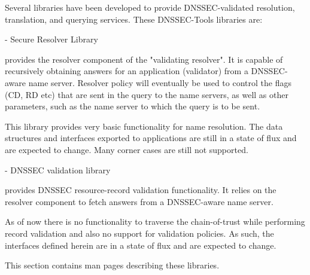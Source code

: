 
Several libraries have been developed to provide DNSSEC-validated resolution,
translation, and querying services.  These DNSSEC-Tools libraries are:

\begin{description}

\item{} - Secure Resolver Library

 provides the resolver component of the "validating resolver".
It is capable of recursively obtaining answers for an application (validator)
from a DNSSEC-aware name server.  Resolver policy will eventually be used to
control the flags (CD, RD etc) that are sent in the query to the name servers,
as well as other parameters, such as the name server to which the query is
to be sent.

This library provides very basic functionality for name resolution.  The data
structures and interfaces exported to applications are still in a state of
flux and are expected to change. Many corner cases are still not supported.

\item{} - DNSSEC validation library

 provides DNSSEC resource-record validation functionality.  It
relies on the resolver component to fetch answers from a DNSSEC-aware name
server.

As of now there is no functionality to traverse the chain-of-trust while
performing record validation and also no support for validation policies.
As such, the interfaces defined herein are in a state of flux and are
expected to change.

\end{description}

This section contains man pages describing these libraries.





